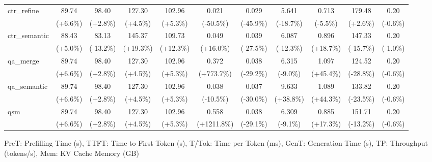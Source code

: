 \begin{table}[t]
{\begin{tabular}{l|cccccccccc}
    ctr\_refine & 89.74 & 98.40 & 127.30 & 102.96 & 0.021 & 0.029 & 5.641 & 0.713 & 179.48 & 0.20 \\
     & {\tiny\color{red!70!black}(+6.6\%)} & {\tiny\color{red!70!black}(+2.8\%)} & {\tiny\color{red!70!black}(+4.5\%)} & {\tiny\color{red!70!black}(+5.3\%)} & {\tiny\color{green!60!black}(-50.5\%)} & {\tiny\color{green!60!black}(-45.9\%)} & {\tiny\color{green!60!black}(-18.7\%)} & {\tiny\color{green!60!black}(-5.5\%)} & {\tiny\color{green!60!black}(+2.6\%)} & {\tiny\color{green!60!black}(-0.6\%)} \\
    ctr\_semantic & 88.43 & 83.13 & 145.37 & 109.73 & 0.049 & 0.039 & 6.087 & 0.896 & 147.33 & 0.20 \\
     & {\tiny\color{red!70!black}(+5.0\%)} & {\tiny\color{green!60!black}(-13.2\%)} & {\tiny\color{red!70!black}(+19.3\%)} & {\tiny\color{red!70!black}(+12.3\%)} & {\tiny\color{red!70!black}(+16.0\%)} & {\tiny\color{green!60!black}(-27.5\%)} & {\tiny\color{green!60!black}(-12.3\%)} & {\tiny\color{red!70!black}(+18.7\%)} & {\tiny\color{red!70!black}(-15.7\%)} & {\tiny\color{green!60!black}(-1.0\%)} \\
    qa\_merge & 89.74 & 98.40 & 127.30 & 102.96 & 0.372 & 0.038 & 6.315 & 1.097 & 124.52 & 0.20 \\
     & {\tiny\color{red!70!black}(+6.6\%)} & {\tiny\color{red!70!black}(+2.8\%)} & {\tiny\color{red!70!black}(+4.5\%)} & {\tiny\color{red!70!black}(+5.3\%)} & {\tiny\color{red!70!black}(+773.7\%)} & {\tiny\color{green!60!black}(-29.2\%)} & {\tiny\color{green!60!black}(-9.0\%)} & {\tiny\color{red!70!black}(+45.4\%)} & {\tiny\color{red!70!black}(-28.8\%)} & {\tiny\color{green!60!black}(-0.6\%)} \\
    qa\_semantic & 89.74 & 98.40 & 127.30 & 102.96 & 0.038 & 0.037 & 9.633 & 1.089 & 133.82 & 0.20 \\
     & {\tiny\color{red!70!black}(+6.6\%)} & {\tiny\color{red!70!black}(+2.8\%)} & {\tiny\color{red!70!black}(+4.5\%)} & {\tiny\color{red!70!black}(+5.3\%)} & {\tiny\color{green!60!black}(-10.5\%)} & {\tiny\color{green!60!black}(-30.0\%)} & {\tiny\color{red!70!black}(+38.8\%)} & {\tiny\color{red!70!black}(+44.3\%)} & {\tiny\color{red!70!black}(-23.5\%)} & {\tiny\color{green!60!black}(-0.6\%)} \\
    qsm & 89.74 & 98.40 & 127.30 & 102.96 & 0.558 & 0.038 & 6.309 & 0.885 & 151.71 & 0.20 \\
     & {\tiny\color{red!70!black}(+6.6\%)} & {\tiny\color{red!70!black}(+2.8\%)} & {\tiny\color{red!70!black}(+4.5\%)} & {\tiny\color{red!70!black}(+5.3\%)} & {\tiny\color{red!70!black}(+1211.8\%)} & {\tiny\color{green!60!black}(-29.1\%)} & {\tiny\color{green!60!black}(-9.1\%)} & {\tiny\color{red!70!black}(+17.3\%)} & {\tiny\color{red!70!black}(-13.2\%)} & {\tiny\color{green!60!black}(-0.6\%)} \\
    \bottomrule
    \end{tabular}%
    }
    \vspace{0.1cm}
    \footnotesize{PreT: Prefilling Time (s), TTFT: Time to First Token (s), T/Tok: Time per Token (ms), GenT: Generation Time (s), TP: Throughput (tokens/s), Mem: KV Cache Memory (GB)}
\end{table}

